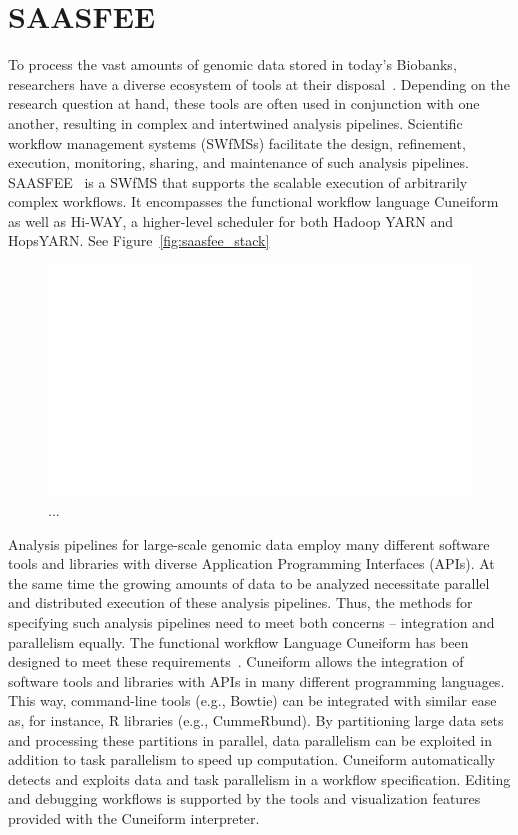 \section{SAASFEE}
\label{saasfee}


To process the vast amounts of genomic data stored in today's Biobanks, researchers have a diverse ecosystem of tools at their disposal~\cite{Pabinger2014}. Depending on the research question at hand, these tools are often used in conjunction with one another, resulting in complex and intertwined analysis pipelines. Scientific workflow management systems (SWfMSs) facilitate the design, refinement, execution, monitoring, sharing, and maintenance of such analysis pipelines. SAASFEE~\cite{vldb_demo} is a SWfMS that supports the scalable execution of arbitrarily complex workflows. It encompasses the functional workflow language Cuneiform as well as Hi-WAY, a higher-level scheduler for both Hadoop YARN and HopsYARN. See Figure~\ref{fig:saasfee_stack}

\begin{figure}
  \centering
  \includegraphics[width=.6\textwidth]{imgs/saasfee_stack.pdf}
  \caption{...}
  \label{fig:variant_call}
\end{figure}

Analysis pipelines for large-scale genomic data employ many different software tools and libraries with diverse Application Programming Interfaces (APIs). At the same time the growing amounts of data to be analyzed necessitate parallel and distributed execution of these analysis pipelines. Thus, the methods for specifying such analysis pipelines need to meet both concerns -- integration and parallelism equally. The functional workflow Language Cuneiform has been designed to meet these requirements~\cite{Brandt2015}. Cuneiform allows the integration of software tools and libraries with APIs in many different programming languages. This way, command-line tools (e.g., Bowtie) can be integrated with similar ease as, for instance, R libraries (e.g., CummeRbund). By partitioning large data sets and processing these partitions in parallel, data parallelism can be exploited in addition to task parallelism to speed up computation. Cuneiform automatically detects and exploits data and task parallelism in a workflow specification. Editing and debugging workflows is supported by the tools and visualization features provided with the Cuneiform interpreter.

